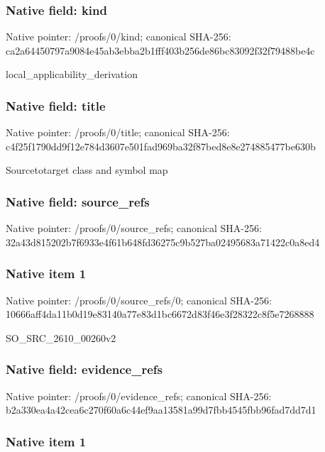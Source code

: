 \documentclass[10pt,a4paper]{article}
\begin{document}
\subsubsection{Native field: kind}


Native pointer: /proofs/0/kind; canonical SHA-256: ca2a64450797a9084e45ab3e\allowbreak{}bba2b1fff403b256de86bc83\allowbreak{}092f32f79488be4c


local\_applicability\_derivation


\subsubsection{Native field: title}


Native pointer: /proofs/0/title; canonical SHA-256: c4f25f1790dd9f12e784d360\allowbreak{}7e501fad969ba32f87bed8e8\allowbreak{}e274885477be630b


Sourcetotarget class and symbol map


\subsubsection{Native field: source\_refs}


Native pointer: /proofs/0/source\_refs; canonical SHA-256: 32a43d815202b7f6933e4f61\allowbreak{}b648fd36275c9b527ba02495\allowbreak{}683a71422c0a8ed4



\subsubsection{Native item 1}


Native pointer: /proofs/0/source\_refs/0; canonical SHA-256: 10666aff4da11b0d19e83140\allowbreak{}a77e83d1bc6672d83f46e3f2\allowbreak{}8322c8f5e7268888


SO\_SRC\_2610\_00260v2


\subsubsection{Native field: evidence\_refs}


Native pointer: /proofs/0/evidence\_refs; canonical SHA-256: b2a330ea4a42cea6c270f60a\allowbreak{}6c44ef9aa13581a99d7fbb45\allowbreak{}45fbb96fad7dd7d1



\subsubsection{Native item 1}
\end{document}
